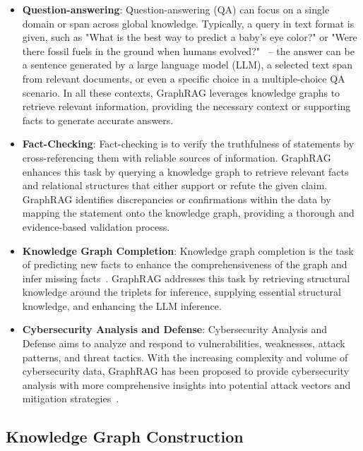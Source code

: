 \begin{itemize}[leftmargin=*]
    \item \textbf{Question-answering}: Question-answering (QA) can focus on a single domain or span across global knowledge. Typically, a query in text format is given, such as "What is the best way to predict a baby's eye color?" or "Were there fossil fuels in the ground when humans evolved?"~\cite{tian2024graph} -- the answer can be a sentence generated by a large language model (LLM), a selected text span from relevant documents, or even a specific choice in a multiple-choice QA scenario. In all these contexts, GraphRAG leverages knowledge graphs to retrieve relevant information, providing the necessary context or supporting facts to generate accurate answers.
    
    \item \textbf{Fact-Checking}: Fact-checking is to verify the truthfulness of statements by cross-referencing them with reliable sources of information. GraphRAG enhances this task by querying a knowledge graph to retrieve relevant facts and relational structures that either support or refute the given claim. GraphRAG identifies discrepancies or confirmations within the data by mapping the statement onto the knowledge graph, providing a thorough and evidence-based validation process.

    \item \textbf{Knowledge Graph Completion}: Knowledge graph completion is the task of predicting new facts to enhance the comprehensiveness of the graph and infer missing facts~\cite{zhang2023making}. GraphRAG addresses this task by retrieving structural knowledge around the triplets for inference, supplying essential structural knowledge, and enhancing the LLM inference.

    \item \textbf{Cybersecurity Analysis and Defense}: Cybersecurity Analysis and Defense aims to analyze and respond to vulnerabilities, weaknesses, attack patterns, and threat tactics. With the increasing complexity and volume of cybersecurity data, GraphRAG has been proposed to provide cybersecurity analysis with more comprehensive insights into potential attack vectors and mitigation strategies~\cite{rahman2024retrieval}.

\end{itemize}


\subsection{Knowledge Graph Construction}

